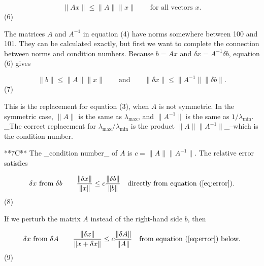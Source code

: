 \[\|Ax\|\leq\|A\|\|x\|\qquad\text{for all vectors $x$.}\] (6)

The matrices \(A\) and \(A^{-1}\) in equation (4) have norms somewhere between 100 and 101. They can be calculated exactly, but first we want to complete the connection between norms and condition numbers. Because \(b=Ax\) and \(\delta x=A^{-1}\delta b\), equation (6) gives

\[\|b\|\leq\|A\|\|x\|\qquad\text{and}\qquad\|\delta x\|\leq\|A^{-1}\|\|\delta b\|.\] (7)

This is the replacement for equation (3), when \(A\) is not symmetric. In the symmetric case, \(\|A\|\) is the same as \(\lambda_{\max}\), and \(\|A^{-1}\|\) is the same as \(1/\lambda_{\min}\). _The correct replacement for \(\lambda_{\max}/\lambda_{\min}\) is the product \(\|A\|\|A^{-1}\|\)_--which is the condition number.

**7C** The _condition number_ of \(A\) is \(c=\|A\|\|A^{-1}\|\). The relative error satisfies

\[\delta x\ \text{from $\delta b$}\qquad\frac{\|\delta x\|}{\|x\|}\leq c\frac{ \|\delta b\|}{\|b\|}\quad\text{directly from equation (\ref{eq:error})}.\] (8)

If we perturb the matrix \(A\) instead of the right-hand side \(b\), then

\[\delta x\ \text{from $\delta A$}\qquad\frac{\|\delta x\|}{\|x+\delta x\|} \leq c\frac{\|\delta A\|}{\|A\|}\quad\text{from equation (\ref{eq:error}) below}.\] (9) 